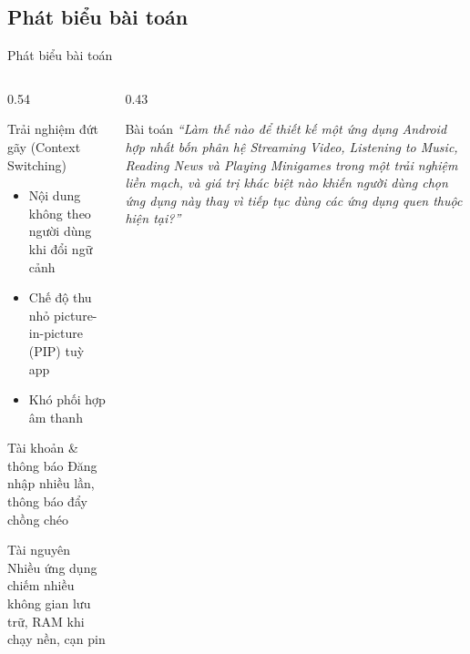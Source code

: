 \subsection{Phát biểu bài toán}
\begin{frame}{Phát biểu bài toán}
\begin{columns}[T]
\begin{column}{0.54\textwidth}
\footnotesize
\begin{block}{Trải nghiệm đứt gãy (Context Switching)}
\begin{itemize}\setlength{\itemsep}{1pt}
\item Nội dung không theo người dùng khi đổi ngữ cảnh
\item Chế độ thu nhỏ picture-in-picture (PIP) tuỳ app
\item Khó phối hợp âm thanh
\end{itemize}
\end{block}
\vspace{-0.06cm}
\begin{block}{Tài khoản \& thông báo}
Đăng nhập nhiều lần, thông báo đẩy chồng chéo
\end{block}
\vspace{-0.06cm}
\begin{block}{Tài nguyên}
Nhiều ứng dụng chiếm nhiều không gian lưu trữ, RAM khi chạy nền, cạn pin
\end{block}
\end{column}
\begin{column}{0.43\textwidth}
\begin{alertblock}{Bài toán}
\small\itshape
``Làm thế nào để thiết kế một ứng dụng Android hợp nhất bốn phân hệ Streaming Video, Listening to Music, Reading News và Playing Minigames trong một trải nghiệm liền mạch, và giá trị khác biệt nào khiến người dùng chọn ứng dụng này thay vì tiếp tục dùng các ứng dụng quen thuộc hiện tại?''
\end{alertblock}
\end{column}
\end{columns}
\end{frame}

